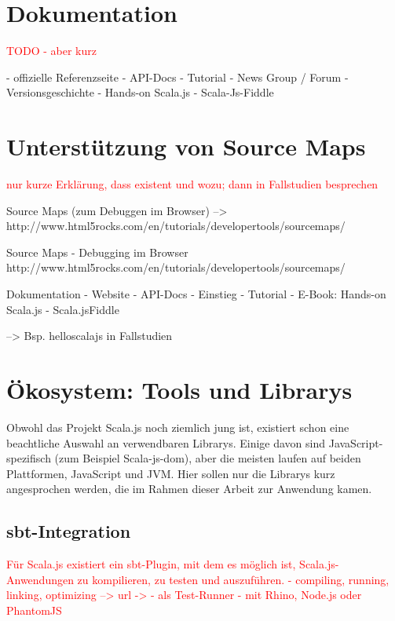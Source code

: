 \documentclass[a4paper, 12pt, hidelinks, listof=totoc, listoftables=totoc, bibliography=totoc]{scrreprt}
\newcommand{\TODO}[1]{\textcolor{red}{#1}\newline}
\begin{document}
\section{Dokumentation}

\TODO{TODO - aber kurz}

- offizielle Referenzseite
- \ac{API}-Docs
- Tutorial
- News Group / Forum
- Versionsgeschichte
- Hands-on Scala.js
- Scala-Js-Fiddle



\section{Unterstützung von Source Maps}

\TODO{nur kurze Erklärung, dass existent und wozu; dann in Fallstudien besprechen}

Source Maps (zum Debuggen im Browser)  -->  http://www.html5rocks.com/en/tutorials/developertools/sourcemaps/

Source Maps
  - Debugging im Browser
  http://www.html5rocks.com/en/tutorials/developertools/sourcemaps/

Dokumentation
  - Website
  - \ac{API}-Docs
  - Einstieg
    - Tutorial
    - E-Book: Hands-on Scala.js
    - Scala.jsFiddle

--> Bsp. helloscalajs in Fallstudien




\section{Ökosystem: Tools und Librarys}\label{sec:sjs-libs}

Obwohl das Projekt Scala.js noch ziemlich jung ist, existiert schon eine beachtliche Auswahl an verwendbaren Librarys. Einige davon sind JavaScript-spezifisch (zum Beispiel Scala-js-dom), aber die meisten laufen auf beiden Plattformen, JavaScript und \ac{JVM}. Hier sollen nur die Librarys kurz angesprochen werden, die im Rahmen dieser Arbeit zur Anwendung kamen.





\subsection{sbt-Integration}


\TODO{Für Scala.js existiert ein sbt-Plugin, mit dem es möglich ist, Scala.js-Anwendungen zu kompilieren, zu testen und auszuführen.}
\TODO{  - compiling, running, linking, optimizing --> url -> %
}
\TODO{  - als Test-Runner - mit Rhino, Node.js oder PhantomJS}
\end{document}
